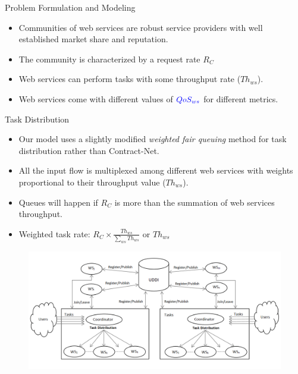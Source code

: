\documentclass{beamer}
\begin{document}
\begin{frame}{Problem Formulation and Modeling}
    \begin{itemize}
        \item Communities of web services are robust service providers with well established {\color{blue}market share} and {\color{blue}reputation}.
        \item The community is characterized by a {\color{blue}request rate $R_C$}
        \item Web services can perform tasks with some {\color{blue}throughput} rate ($Th_{ws}$).
        \item Web services come with different values of ${\color{blue}QoS_{ws}}$ for different metrics.
    \end{itemize}
\end{frame}

\begin{frame}{Task Distribution}
    \begin{itemize}
        \item Our model uses a slightly modified \emph{weighted fair queuing} method for task distribution rather than Contract-Net.
        \item All the input flow is multiplexed among different web services with weights proportional to their throughput value ($Th_{ws}$).
        \item Queues will happen if $R_C$ is more than the summation of web services throughput.
        \item Weighted task rate: $R_C \times \frac{Th_{ws}}{\sum_{ws}{Th_{ws}}}$ or $Th_{ws}$
    \end{itemize}
    \begin{figure}[htbp]
        \centering
        \includegraphics[width=0.8 \columnwidth]{figures/community.png}
    \end{figure}
\end{frame}
\end{document}

